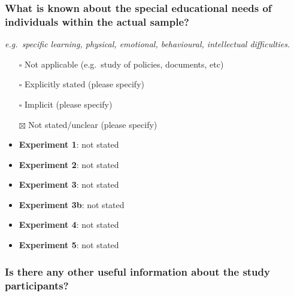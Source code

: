 \documentclass[
  doc, a4paper]{apa7}
\begin{document}
\subsubsection{What is known about the special educational needs of individuals within the actual sample?}\label{what-is-known-about-the-special-educational-needs-of-individuals-within-the-actual-sample}

\emph{e.g.~specific learning, physical, emotional, behavioural, intellectual difficulties.}

\begin{itemize}
\item[$\square$]
  Not applicable (e.g.~study of policies, documents, etc)
\item[$\square$]
  Explicitly stated (please specify)
\item[$\square$]
  Implicit (please specify)
\item[$\boxtimes$]
  Not stated/unclear (please specify)
\item
  \textbf{Experiment 1}: not stated\\
\item
  \textbf{Experiment 2}: not stated
\item
  \textbf{Experiment 3}: not stated
\item
  \textbf{Experiment 3b}: not stated
\item
  \textbf{Experiment 4}: not stated
\item
  \textbf{Experiment 5}: not stated
\end{itemize}

\subsubsection{Is there any other useful information about the study participants?}\label{is-there-any-other-useful-information-about-the-study-participants}
\end{document}
